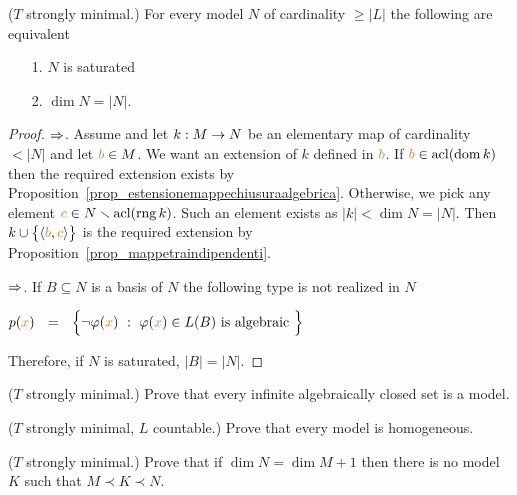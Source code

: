 \begin{proposition}
  ($T$ strongly minimal.) For every model $N$ of cardinality $\ge|L|$ the following are equivalent
  \begin{itemize}
  \item[1.] $N$ is saturated
  \item[2.] $\dim N=|N|$.
  \end{itemize}
\end{proposition}

\begin{proof}
  $\Rightarrow$.
  Assume  and let $k:M\rightarrow N$ be an elementary map of cardinality $<|N|$ and let ${\color{brown} b}\in M$.
  We want an extension of $k$ defined in ${\color{brown} b}$.
  If ${\color{brown} b}\in{\rm acl}(\mathop{\rm dom} k)$ then the required extension exists by Proposition~\ref{prop_estensionemappechiusuraalgebrica}.
  Otherwise, we pick any element ${\color{brown} c}\in N\smallsetminus{\rm acl}(\mathop{\rm rng} k)$.
  Such an element exists as $|k|<\dim N=|N|$.
  Then $k\cup\big\{\langle{\color{brown}b},{\color{brown} c}\rangle\big\}$ is the required extension by Proposition~\ref{prop_mappetraindipendenti}.

  $\Rightarrow$.
  If $B\subseteq N$ is a basis of $N$ the following type is not realized in $N$

  \hfil $p({\color{brown} x})\ \ =\ \ \Big\{\neg\varphi({\color{brown} x})\ :\ \varphi({\color{brown} x})\in L(B)\textrm{ is algebraic }\Big\}$

  Therefore, if $N$ is saturated, $|B|=|N|$.
\end{proof}

\begin{exercise}\label{ex_infinite_acl}
  ($T$ strongly minimal.) Prove that every infinite algebraically closed set is a model.
\end{exercise}

\begin{exercise}\label{ex_sm_homogeneous}
  ($T$ strongly minimal, $L$ countable.) Prove that every model is homogeneous. 
\end{exercise}

\begin{exercise}
  ($T$ strongly minimal.) Prove that if $\dim N=\dim M+1$ then there is no model $K$ such that $M\prec K\prec N$. 
\end{exercise}




% 

